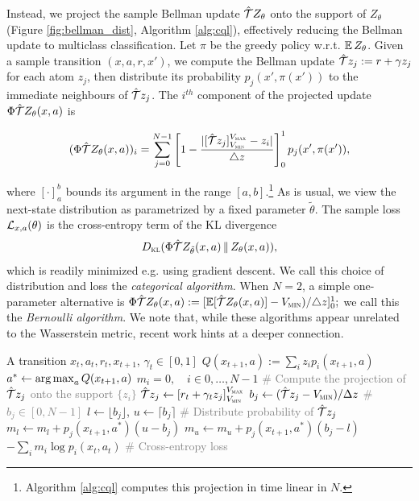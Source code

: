 \documentclass{article}
\def \Vmax {V_{\textsc{max}}}
\def \Vmin {V_{\textsc{min}}}
\begin{document}
Instead, we project the sample Bellman update $\hat {\mathcal{T}} Z_\theta$ onto the support of $Z_\theta$ (Figure \ref{fig:bellman_dist}, Algorithm \ref{alg:cql}), effectively reducing the Bellman update to multiclass classification. Let $\pi$ be the greedy policy w.r.t. $\expect Z_\theta$.
Given a sample transition $(x, a, r, x')$, we compute the Bellman update $\hat {\mathcal{T}} z_j := r + \gamma z_j$ for each atom $z_j$, then distribute its probability $p_j(x', \pi(x'))$ to the immediate neighbours of $\hat {\mathcal{T}} z_j$.
The $i^{th}$ component of the projected update $\Phi \hat {\mathcal{T}} Z_\theta(x,a)$ is
\begin{small}
\begin{equation}
(\Phi \hat \cT Z_\theta(x,a))_i = \sum_{j=0}^{N-1} \left[ 1 - \frac{| [ \hat \cT z_j ]^{\Vmax}_{\Vmin} - z_i|}{\triangle z} \right]^1_0 p_j(x', \pi(x')),
\label{eqn:cat_proj}
\end{equation}
\end{small}
where $[ \cdot ]^b_a$ bounds its argument in the range $[a, b]$.\footnote{Algorithm \ref{alg:cql} computes this projection in time linear in $N$.} As is usual, we view the next-state distribution as parametrized by a fixed parameter $\tilde \theta$. The sample loss $\mathcal{L}_{x,a}(\theta)$ is the cross-entropy term of the KL divergence
\begin{equation*}
D_{\textsc{kl}}(\Phi \hat {\mathcal{T}} Z_{\tilde \theta}(x,a) \, \| \, Z_\theta(x,a)),
\end{equation*}
which is readily minimized e.g. using gradient descent. We call this choice of distribution and loss the \emph{categorical algorithm}. When $N = 2$, a simple one-parameter alternative is
%
$\Phi \hat \cT Z_\theta(x,a) := [\expect [\hat \cT Z_\theta(x,a)] - \Vmin) / \triangle z]^1_0;$
%
we call this the \emph{Bernoulli algorithm}. 
We note that, while these algorithms appear unrelated to the Wasserstein metric, recent work \citep{bellemare17cramer} hints at a deeper connection.

\begin{algorithm}[ht]
\caption{Categorical Algorithm}\label{alg:cql}
\begin{algorithmic}
\INPUT A transition $x_t, a_t, r_t, x_{t+1}$, $\gamma_t \in [0, 1]$
\STATE $Q(x_{t+1}, a) := \sum\nolimits_i z_i p_i(x_{t+1}, a)$
\STATE $a^* \leftarrow \operatorname*{arg\,max}_a Q(x_{t+1}, a)$
\STATE $m_i = 0, \quad i \in 0, \dots, N-1$
	\STATE \textcolor{gray}{\# Compute the projection of $\hat {\mathcal{T}} z_j$ onto the support $\{ z_i \}$}
	\STATE $\hat \cT z_j \leftarrow \left [ r_t + \gamma_t z_j \right ]^{\Vmax}_{\Vmin}$
	\STATE $b_j \leftarrow (\hat \cT z_j - \Vmin) / \Delta z$ \; \textcolor{gray}{\# $b_j \in [0, N-1]$}
	\STATE $l \leftarrow \lfloor b_j \rfloor$, $u \leftarrow \lceil b_j \rceil$
	\STATE \textcolor{gray}{\# Distribute probability of $\hat {\mathcal{T}} z_j$}
	\STATE $m_l \leftarrow m_l + p_j(x_{t+1}, a^*) (u - b_j)$
	\STATE $m_u \leftarrow m_u +  p_j(x_{t+1}, a^*) (b_j - l)$
\ENDFOR
\OUTPUT $-\sum_i m_i \log p_i(x_t, a_t)$ \; \textcolor{gray}{\# Cross-entropy loss}
\end{algorithmic}
\end{algorithm}
\end{document}
